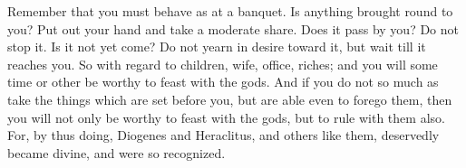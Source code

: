 Remember that you must behave as at a banquet. Is anything brought round
to you? Put out your hand and take a moderate share. Does it pass by you?
Do not stop it. Is it not yet come? Do not yearn in desire toward it, but
wait till it reaches you. So with regard to children, wife, office,
riches; and you will some time or other be worthy to feast with the gods.
And if you do not so much as take the things which are set before you,
but are able even to forego them, then you will not only be worthy to
feast with the gods, but to rule with them also. For, by thus doing,
Diogenes and Heraclitus, and others like them, deservedly became divine,
and were so recognized.
